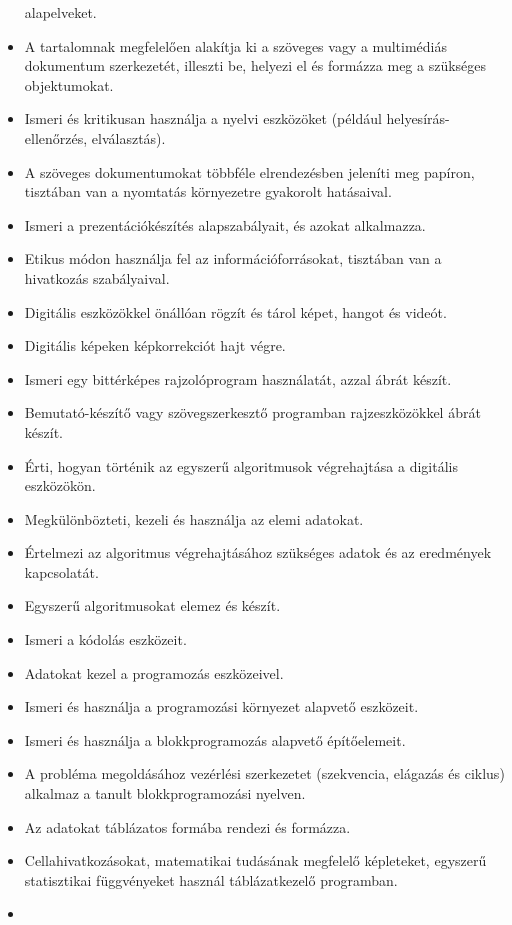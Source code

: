 \begin{itemize}
  alapelveket.
\item
  A tartalomnak megfelelően alakítja ki a szöveges vagy a multimédiás
  dokumentum szerkezetét, illeszti be, helyezi el és formázza meg a
  szükséges objektumokat.
\item
  Ismeri és kritikusan használja a nyelvi eszközöket (például
  helyesírás-ellenőrzés, elválasztás).
\item
  A szöveges dokumentumokat többféle elrendezésben jeleníti meg papíron,
  tisztában van a nyomtatás környezetre gyakorolt hatásaival.
\item
  Ismeri a prezentációkészítés alapszabályait, és azokat alkalmazza.
\item
  Etikus módon használja fel az információforrásokat, tisztában van a
  hivatkozás szabályaival.
\item
  Digitális eszközökkel önállóan rögzít és tárol képet, hangot és
  videót.
\item
  Digitális képeken képkorrekciót hajt végre.
\item
  Ismeri egy bittérképes rajzolóprogram használatát, azzal ábrát készít.
\item
  Bemutató-készítő vagy szövegszerkesztő programban rajzeszközökkel
  ábrát készít.
\item
  Érti, hogyan történik az egyszerű algoritmusok végrehajtása a
  digitális eszközökön.
\item
  Megkülönbözteti, kezeli és használja az elemi adatokat.
\item
  Értelmezi az algoritmus végrehajtásához szükséges adatok és az
  eredmények kapcsolatát.
\item
  Egyszerű algoritmusokat elemez és készít.
\item
  Ismeri a kódolás eszközeit.
\item
  Adatokat kezel a programozás eszközeivel.
\item
  Ismeri és használja a programozási környezet alapvető eszközeit.
\item
  Ismeri és használja a blokkprogramozás alapvető építőelemeit.
\item
  A probléma megoldásához vezérlési szerkezetet (szekvencia, elágazás és
  ciklus) alkalmaz a tanult blokkprogramozási nyelven.
\item
  Az adatokat táblázatos formába rendezi és formázza.
\item
  Cellahivatkozásokat, matematikai tudásának megfelelő képleteket,
  egyszerű statisztikai függvényeket használ táblázatkezelő programban.
\item

\end{itemize}
